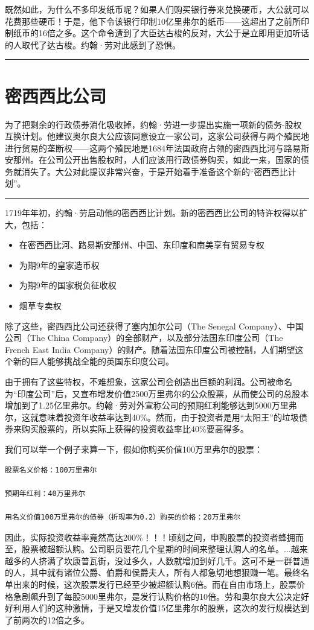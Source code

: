 \documentclass[12pt,oneside]{book}
\newcommand\hr{\par\noindent\hrule}
\begin{document}
既然如此，为什么不多印发纸币呢？如果人们购买银行券来兑换硬币，大公就可以花费那些硬币！于是，他下令该银行印制10亿里弗尔的纸币——这超出了之前所印制纸币的16倍之多。这个命令遭到了大臣达古梭的反对，大公于是立即用更加听话的人取代了达古梭。约翰·劳对此感到了恐惧。
\hr 


\section{密西西比公司}
为了把剩余的行政债券消化吸收掉，约翰·劳进一步提出实施一项新的债务-股权互换计划。他建议奥尔良大公应该同意设立一家公司，这家公司获得与两个殖民地进行贸易的垄断权——这两个殖民地是1684年法国政府占领的密西西比河与路易斯安那州。在公司公开出售股权时，人们应该用行政债券购买，如此一来，国家的债务就消失了。大公对此提议非常兴奋，于是开始着手准备这个新的“密西西比计划”。

\hr
1719年年初，约翰·劳启动他的密西西比计划。新的密西西比公司的特许权得以扩大，包括：

\begin{itemize}
\item 在密西西比河、路易斯安那州、中国、东印度和南美享有贸易专权
\item 为期9年的皇家造币权
\item 为期9年的国家税负征收权
\item 烟草专卖权
\end{itemize}


除了这些，密西西比公司还获得了塞内加尔公司（The Senegal Company）、中国公司（The China Company）的全部财产，以及部分法国东印度公司（The French East India Company）的财产。随着法国东印度公司被控制，人们期望这个新的巨人能够挑战全能的英国东印度公司。

由于拥有了这些特权，不难想象，这家公司会创造出巨额的利润。公司被命名为“印度公司”后，又宣布增发价值2500万里弗尔的公众股票，从而使公司的总股本增加到了1.25亿里弗尔。约翰·劳对外宣称公司的预期红利能够达到5000万里弗尔，这就意味着投资年收益率达到40\%。然而，由于投资者是用“太阳王”的垃圾债券来购买股票的，所以实际上获得的投资收益率比40\%要高得多。

我们可以举一个例子来算一下，假如你购买价值100万里弗尔的股票：
\begin{Verbatim}
股票名义价格：100万里弗尔

预期年红利：40万里弗尔

用名义价值100万里弗尔的债券（折现率为0.2）购买的价格：20万里弗尔
\end{Verbatim}

因此，实际投资收益率竟然高达200\%！！！顷刻之间，申购股票的投资者蜂拥而至，股票被超额认购。公司职员要花几个星期的时间来整理认购人的名单。...越来越多的人挤满了坎康普瓦街，没过多久，人数就增加到好几千。这可不是一群普通的人，其中就有诸位公爵、伯爵和侯爵夫人，所有人都急切地想狠赚一笔。最终名单出来的时候，这次股票发行已经至少被超额认购6倍。而在自由市场上，股票价格急剧飙升到了每股5000里弗尔，是发行认购价格的10倍。劳和奥尔良大公决定好好利用人们的这种激情，于是又增发价值15亿里弗尔的股票，这次的发行规模达到了前两次的12倍之多。
\end{document}
